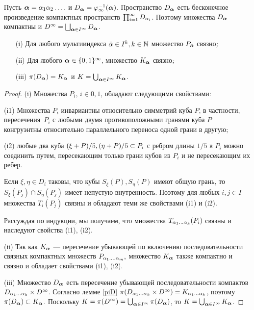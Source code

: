 Пусть ${\bm{\alpha}}=\alpha_1\alpha_2\ldots.$ и $D_{\bm{\alpha}}=\varphi_\infty^{-1}({\bm{\alpha}})$. 
Пространство $D_{\bm{\alpha}}$ есть бесконечное произведение компактных пространств $\prod_{i=1}^\infty D_{\alpha_i}$.
Поэтому множества $D_{\bm{\alpha}}$ компактны и $D^\infty=\bigsqcup_{{\bm{\alpha}}\in I^\infty}D_{\bm{\alpha}}$.
\begin{lemma}\label{svyaz}
\begin{itemize}[nolistsep]
\item[{\rm (i)}]  Для любого мультииндекса $\bar{\alpha}\in I^k, k\in\mathbb{N}$ множество   $P_{\bar{\alpha}}$ связно\emph{;}
\item[{\rm (ii)}] Для любого ${\bm{\alpha}}\in\{0,1\}^\infty$, множество $K_{\bm{\alpha}}$ связно\emph{;}
\item[{\rm (iii)}] $\pi(D_{\bm{\alpha}})=K_{\bm{\alpha}}$ и $K=\bigcup_{{\bm{\alpha}}\in I^\infty}K_{\bm{\alpha}}$.
\end{itemize}
\end{lemma}

\begin{proof}
(i) Множества $P_i$,  $i\in{0,1}$, обладают следующими  свойствами:\smallskip

(i1)  Множества $P_i$ инвариантны относительно симметрий куба $P$, в частности, пересечения~$P_i$ с любыми двумя противоположными гранями куба $P$ конгруэнтны относительно параллельного переноса одной грани в другую;\smallskip

(i2) любые два куба $(\xi+P)/5, (\eta+P)/5 \subset P_i$ с ребром длины $1/5$ в $P_i$ можно соединить путем, пересекающим только грани кубов из $P_i$ и не пересекающим их ребер.\smallskip

Если $\xi,\eta\in D_i$ таковы, что кубы $S_\xi(P), S_\eta(P)$ имеют общую грань, то $S_\xi(P_j)\cap S_\eta(P_j)$ имеет непустую внутренность.  
Поэтому для любых $i,j\in I$ множества $T_i(P_j)$ связны  и обладают теми же свойствами (i1) и (i2).

Рассуждая по индукции, мы получаем, что множества $T_{\alpha_1\ldots\alpha_k} (P_i)$ связны и наследуют  свойства (i1), (i2).\smallskip

(ii) Так как $K_{\bm{\alpha}}$ --- пересечение убывающей по включению последовательности связных компактных множеств $P_{\alpha_1\ldots.\alpha_m},$  множество $K_{\bm{\alpha}}$ также компактно и связно и обладает свойствами (i1), (i2).\smallskip

(iii) Множество $D_{\bm{\alpha}}$ есть пересечение убывающей последовательности компактов
$D_{\alpha_1\ldots\alpha_k}\times D^\infty$. Согласно лемме  \ref{piD} $\pi(D_{\alpha_1\ldots\alpha_k}\times D^\infty)=K_{\alpha_1\ldots\alpha_k} $,  поэтому $\pi(D_{\bm{\alpha}})\subset K_{\bm{\alpha}}$. Поскольку $K=\pi(D^\infty)=\bigcup_{{\bm{\alpha}}\in I^\infty}\pi(D_{\bm{\alpha}})$, то $K=\bigcup_{{\bm{\alpha}}\in I^\infty}K_{\bm{\alpha}}$.
\end{proof}


